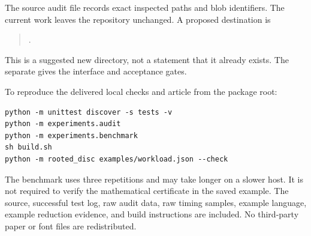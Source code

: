 \documentclass[11pt,letterpaper]{article}
\theoremstyle{definition}
\begin{document}
The source audit file records exact inspected paths and blob identifiers. The current work leaves the repository unchanged. A proposed destination is
\begin{quote}\small
{}.
\end{quote}
This is a suggested new directory, not a statement that it already exists. The separate  gives the interface and acceptance gates.

To reproduce the delivered local checks and article from the package root:
\begin{lstlisting}
python -m unittest discover -s tests -v
python -m experiments.audit
python -m experiments.benchmark
sh build.sh
python -m rooted_disc examples/workload.json --check
\end{lstlisting}
The benchmark uses three repetitions and may take longer on a slower host. It is not required to verify the mathematical certificate in the saved example. The source, successful test log, raw audit data, raw timing samples, example language, example reduction evidence, and build instructions are included. No third-party paper or font files are redistributed.
\end{document}
